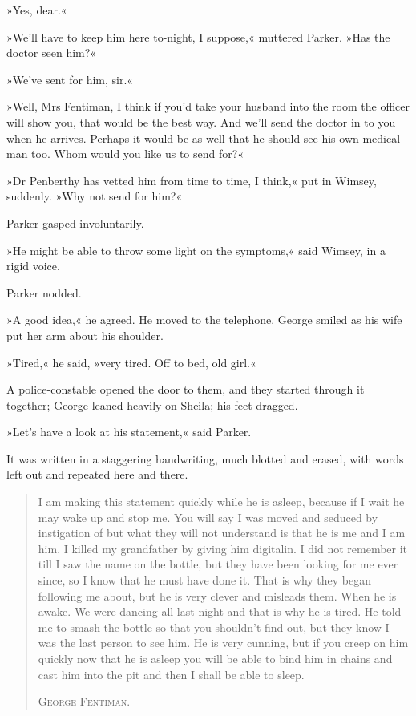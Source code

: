 »Yes, dear.«

»We'll have to keep him here to-night, I suppose,« muttered Parker. »Has the doctor seen him?«

»We've sent for him, sir.«

»Well, Mrs Fentiman, I think if you'd take your husband into the room the officer will show you, that would be the best way. And we'll send the doctor in to you when he arrives. Perhaps it would be as well that he should see his own medical man too. Whom would you like us to send for?«

»Dr Penberthy has vetted him from time to time, I think,« put in Wimsey, suddenly. »Why not send for him?«

Parker gasped involuntarily.

»He might be able to throw some light on the symptoms,« said Wimsey, in a rigid voice.

Parker nodded.

»A good idea,« he agreed. He moved to the telephone. George smiled as his wife put her arm about his shoulder.

»Tired,« he said, »very tired. Off to bed, old girl.«

A police-constable opened the door to them, and they started through it together; George leaned heavily on Sheila; his feet dragged.

»Let's have a look at his statement,« said Parker.

It was written in a staggering handwriting, much blotted and erased, with words left out and repeated here and there.

\begin{quote}
I am making this statement quickly while he is asleep, because if I wait he may wake up and stop me. You will say I was moved and seduced by instigation of but what they will not understand is that he is me and I am him. I killed my grandfather by giving him digitalin. I did not remember it till I saw the name on the bottle, but they have been looking for me ever since, so I know that he must have done it. That is why they began following me about, but he is very clever and misleads them. When he is awake. We were dancing all last night and that is why he is tired. He told me to smash the bottle so that you shouldn't find out, but they know I was the last person to see him. He is very cunning, but if you creep on him quickly now that he is asleep you will be able to bind him in chains and cast him into the pit and then I shall be able to sleep.
\begin{flushright}
\textsc{George Fentiman.}
\end{flushright}
\end{quote}

